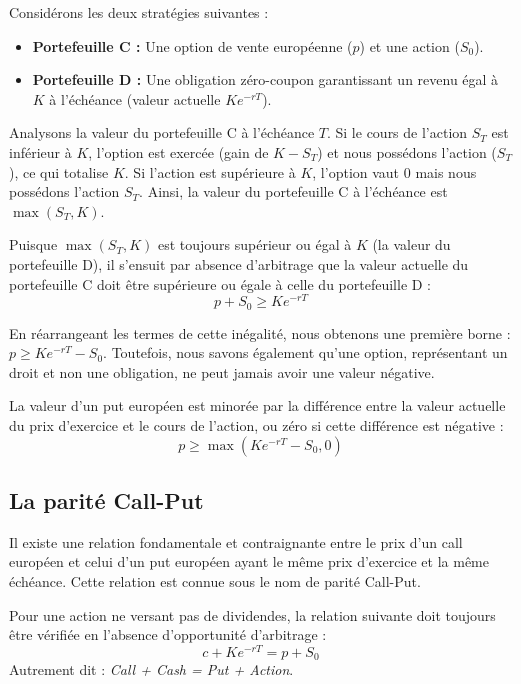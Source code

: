 \begin{proofbox}
Considérons les deux stratégies suivantes :
\begin{itemize}
    \item \textbf{Portefeuille C :} Une option de vente européenne ($p$) et une action ($S_0$).
    \item \textbf{Portefeuille D :} Une obligation zéro-coupon garantissant un revenu égal à $K$ à l'échéance (valeur actuelle $Ke^{-rT}$).
\end{itemize}

Analysons la valeur du portefeuille C à l'échéance $T$. Si le cours de l'action $S_T$ est inférieur à $K$, l'option est exercée (gain de $K-S_T$) et nous possédons l'action ($S_T$), ce qui totalise $K$. Si l'action est supérieure à $K$, l'option vaut 0 mais nous possédons l'action $S_T$.
Ainsi, la valeur du portefeuille C à l'échéance est $\max(S_T, K)$.

Puisque $\max(S_T, K)$ est toujours supérieur ou égal à $K$ (la valeur du portefeuille D), il s'ensuit par absence d'arbitrage que la valeur actuelle du portefeuille C doit être supérieure ou égale à celle du portefeuille D :
$$ p + S_0 \ge Ke^{-rT} $$
\end{proofbox}

En réarrangeant les termes de cette inégalité, nous obtenons une première borne : $p \ge Ke^{-rT} - S_0$. Toutefois, nous savons également qu'une option, représentant un droit et non une obligation, ne peut jamais avoir une valeur négative.

\begin{theorembox}
La valeur d'un put européen est minorée par la différence entre la valeur actuelle du prix d'exercice et le cours de l'action, ou zéro si cette différence est négative :
$$ p \ge \max(Ke^{-rT} - S_0, 0) $$
\end{theorembox}

\subsection{La parité Call-Put}

Il existe une relation fondamentale et contraignante entre le prix d'un call européen et celui d'un put européen ayant le même prix d'exercice et la même échéance. Cette relation est connue sous le nom de parité Call-Put.

\begin{theorembox}
Pour une action ne versant pas de dividendes, la relation suivante doit toujours être vérifiée en l'absence d'opportunité d'arbitrage :
$$ c + Ke^{-rT} = p + S_0 $$
Autrement dit : \textit{Call + Cash = Put + Action}.
\end{theorembox}

